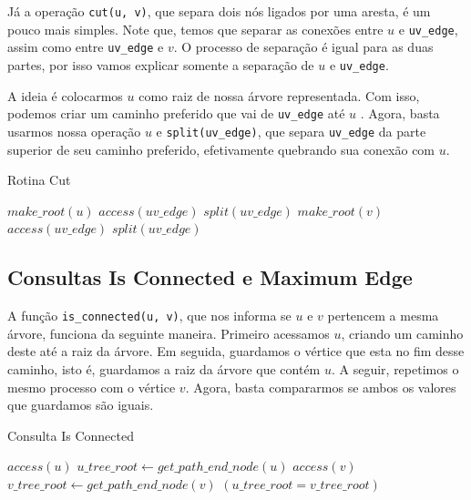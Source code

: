 Já a operação \texttt{cut(u, v)}, que separa dois nós ligados por uma aresta, é um pouco mais simples. Note que, temos que separar as conexões entre $u$ e \texttt{uv\_edge}, assim como entre \texttt{uv\_edge} e $v$. O processo de separação é igual para as duas partes, por isso vamos explicar somente a separação de $u$ e \texttt{uv\_edge}.

A ideia é colocarmos $u$ como raiz de nossa árvore representada. Com isso, podemos criar um caminho preferido que vai de \texttt{uv\_edge} até $u$ . Agora, basta usarmos nossa operação $u$ e \texttt{split(uv\_edge)}, que separa \texttt{uv\_edge} da parte superior de seu caminho preferido, efetivamente quebrando sua conexão com $u$.

\begin{algorithm}[h!]
    \caption{Rotina Cut}\label{lct:cut}
    \begin{algorithmic}
        \State {}
        \State $make\_root(u)$
        \State $access(uv\_edge)$
        \State $split(uv\_edge)$
        \State {}
        \State $make\_root(v)$
        \State $access(uv\_edge)$
        \State $split(uv\_edge)$
        \EndFunction
    \end{algorithmic}
\end{algorithm}

\subsection{Consultas Is Connected e Maximum Edge}
\label{subsection:lct-is-connected}

A função \texttt{is\_connected(u, v)}, que nos informa se $u$ e $v$ pertencem a mesma árvore, funciona da seguinte maneira. Primeiro acessamos $u$, criando um caminho deste até a raiz da árvore. Em seguida, guardamos o vértice que esta no fim desse caminho, isto é, guardamos a raiz da árvore que contém $u$. A seguir, repetimos o mesmo processo com o vértice $v$. Agora, basta compararmos se ambos os valores que guardamos são iguais.

\begin{algorithm}[h!]
    \caption{Consulta Is Connected}\label{lct:is-connected}
    \begin{algorithmic}
        \State $access(u)$
        \State $u\_tree\_root \gets get\_path\_end\_node(u)$
        \State $access(v)$
        \State $v\_tree\_root \gets get\_path\_end\_node(v)$
        \State \Return $(u\_tree\_root = v\_tree\_root)$
        \EndFunction
    \end{algorithmic}
\end{algorithm}

